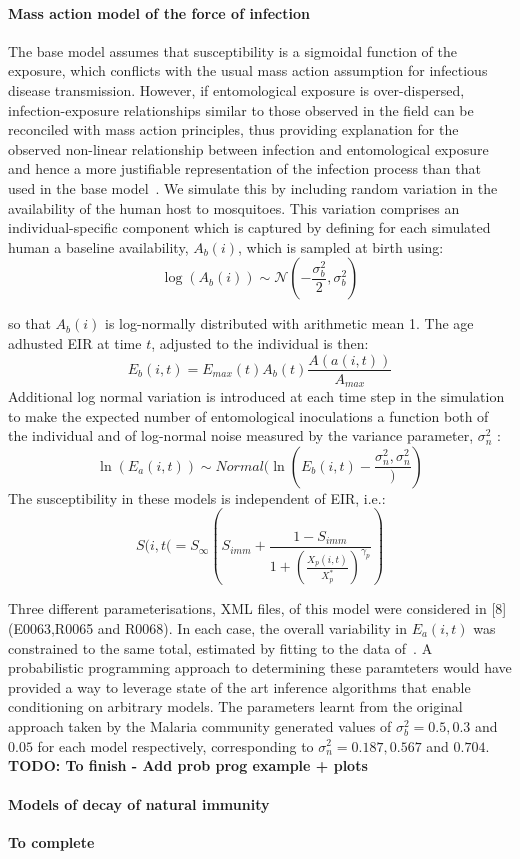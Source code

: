 \documentclass{article}
\begin{document}
\paragraph{Mass action model of the force of infection}
The base model assumes that susceptibility is a sigmoidal function of the exposure, which conflicts
with the usual mass action assumption for infectious disease transmission.
However, if entomological exposure is over-dispersed, 
infection-exposure relationships similar to those observed in the field 
can be reconciled with mass action principles, thus providing explanation
for the observed non-linear relationship between infection and entomological exposure
and hence a more justifiable representation of the infection process than that used
in the base model~\cite{smith2008estimation}. 
We simulate this by including random variation in the availability of the human host to mosquitoes.
This variation comprises an individual-specific component which is captured by defining
for each simulated human a baseline availability, $A_b(i)$, which is sampled at birth using:
\begin{equation}
  \log(A_b(i)) \sim \mathcal{N}(-\frac{\sigma_b^{2}}{2}, \sigma^{2}_b)
\end{equation}

so that $A_b(i)$ is log-normally distributed with arithmetic mean 1. 
The age adhusted EIR at time $t$, adjusted to the individual is then:
\begin{equation}
  E_{b}(i,t) = E_{max}(t)A_b(t)\frac{A(a(i,t))}{A_{max}}
\end{equation}
Additional log normal variation is introduced at each time step in the simulation 
to make the expected number of entomological inoculations a function
both of the individual and of log-normal noise measured by the
variance parameter, $\sigma^2_n$ :
\begin{equation}
  \ln(E_{a}(i,t)) \sim Normal(\ln(E_{b}(i,t) - \frac{\sigma^2_n, \sigma^2_n}))
\end{equation}
The susceptibility in these models is independent of EIR, i.e.:
\begin{equation}
  S(i,t( = S_{\infty}(S_{imm} + \frac{1 - S_{imm}}{1 + (\frac{X_p(i,t)}{X_{p}^{*}})^{\gamma_p}})
\end{equation}

Three different parameterisations, XML files, of this model were considered in [8] (E0063,R0065 and R0068).
In each case, the overall variability in $E_{a}(i,t)$ was constrained to the same total,
estimated by fitting to the data of~\cite{beier1994plasmodium}.
A probabilistic programming approach to determining these paramteters would
have provided a way to leverage state of the art inference algorithms that 
enable conditioning on arbitrary models. 
The parameters learnt from the original approach taken by the Malaria community 
generated values of $\sigma_b^2 = 0.5, 0.3$ and $0.05$ for each model respectively, corresponding
to $\sigma^2_n = 0.187, 0.567$ and $0.704$. 
\textbf{TODO: To finish - Add prob prog example + plots}

\paragraph{Models of decay of natural immunity}
\textbf{To complete}
\end{document}
